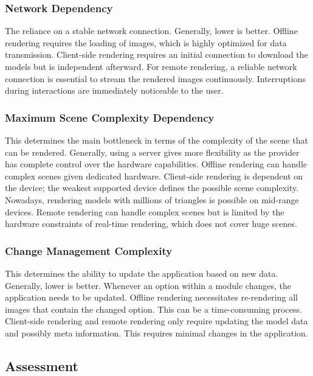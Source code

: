 \subsubsection{Network Dependency}

The reliance on a stable network connection. Generally, lower is better. Offline rendering requires the loading of images, which is highly optimized for data transmission. Client-side rendering requires an initial connection to download the models but is independent afterward. For remote rendering, a reliable network connection is essential to stream the rendered images continuously. Interruptions during interactions are immediately noticeable to the user.

\subsubsection{Maximum Scene Complexity Dependency}

This determines the main bottleneck in terms of the complexity of the scene that can be rendered. Generally, using a server gives more flexibility as the provider has complete control over the hardware capabilities. Offline rendering can handle complex scenes given dedicated hardware. Client-side rendering is dependent on the device; the weakest supported device defines the possible scene complexity. Nowadays, rendering models with millions of triangles is possible on mid-range devices. Remote rendering can handle complex scenes but is limited by the hardware constraints of real-time rendering, which does not cover huge scenes.

\subsubsection{Change Management Complexity}

This determines the ability to update the application based on new data. Generally, lower is better. Whenever an option within a module changes, the application needs to be updated. Offline rendering necessitates re-rendering all images that contain the changed option. This can be a time-consuming process. Client-side rendering and remote rendering only require updating the model data and possibly meta information. This requires minimal changes in the application.

\subsection*{Assessment}
\label{ch:paradigmAssessment}

